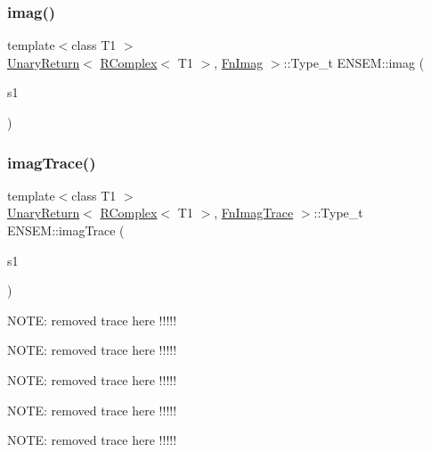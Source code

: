 \subsubsection{\texorpdfstring{imag()}{imag()}}
{\footnotesize\ttfamily template$<$class T1 $>$ \\
\mbox{\hyperlink{structENSEM_1_1UnaryReturn}{Unary\+Return}}$<$ \mbox{\hyperlink{classENSEM_1_1RComplex}{R\+Complex}}$<$ T1 $>$, \mbox{\hyperlink{structENSEM_1_1FnImag}{Fn\+Imag}} $>$\+::Type\+\_\+t E\+N\+S\+E\+M\+::imag (\begin{DoxyParamCaption}\item[{const \mbox{\hyperlink{classENSEM_1_1RComplex}{R\+Complex}}$<$ T1 $>$ \&}]{s1 }\end{DoxyParamCaption})\hspace{0.3cm}{\ttfamily [inline]}}

\mbox{\label{group__rcomplex_ga57832278e9583a5d6e01e547dfdbb896}} 
\subsubsection{\texorpdfstring{imagTrace()}{imagTrace()}}
{\footnotesize\ttfamily template$<$class T1 $>$ \\
\mbox{\hyperlink{structENSEM_1_1UnaryReturn}{Unary\+Return}}$<$ \mbox{\hyperlink{classENSEM_1_1RComplex}{R\+Complex}}$<$ T1 $>$, \mbox{\hyperlink{structENSEM_1_1FnImagTrace}{Fn\+Imag\+Trace}} $>$\+::Type\+\_\+t E\+N\+S\+E\+M\+::imag\+Trace (\begin{DoxyParamCaption}\item[{const \mbox{\hyperlink{classENSEM_1_1RComplex}{R\+Complex}}$<$ T1 $>$ \&}]{s1 }\end{DoxyParamCaption})\hspace{0.3cm}{\ttfamily [inline]}}

N\+O\+TE\+: removed trace here !!!!!

N\+O\+TE\+: removed trace here !!!!!

N\+O\+TE\+: removed trace here !!!!!

N\+O\+TE\+: removed trace here !!!!!

N\+O\+TE\+: removed trace here !!!!! \mbox{\label{group__rcomplex_ga3152e73aedd89eafdfab17e0cb0363b5}} 
